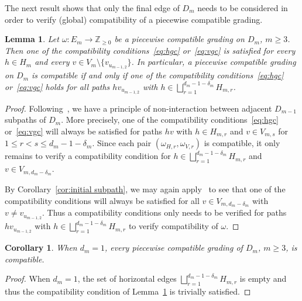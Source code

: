 \documentclass[10pt]{amsart}
\newtheorem{lemma}[theorem]{Lemma}
\newtheorem{corollary}[theorem]{Corollary}
\theoremstyle{definition}
\newcommand{\ZZ}{\mathbb{Z}}
\begin{document}
The next result shows that only the final edge of $D_m$ needs to be considered in order to verify (global) compatibility of a piecewise compatible grading.
\begin{lemma}
 \label{le:compatibility check}
 Let $\omega:E_m\to\ZZ_{\ge0}$ be a piecewise compatible grading on $D_m$, $m\ge3$.
 Then one of the compatibility conditions~\eqref{eq:hgc} or~\eqref{eq:vgc} is satisfied for every $h\in H_m$ and every $v\in V_m\setminus\{v_{u_{m-1,2}}\}$.
 In particular, a piecewise compatible grading on $D_m$ is compatible if and only if one of the compatibility conditions~\eqref{eq:hgc} or~\eqref{eq:vgc} holds for all paths $hv_{u_{m-1,2}}$ with $h\in\bigsqcup\limits_{r=1}^{d_m-1-\delta_m} H_{m,r}$.
\end{lemma}
\begin{proof}
 Following~\cite[Remark~2.22]{rupel2}, we have a principle of non-interaction between adjacent $D_{m-1}$ subpaths of $D_m$. 
 More precisely, one of the compatibility conditions~\eqref{eq:hgc} or~\eqref{eq:vgc} will always be satisfied for paths $hv$ with $h\in H_{m,r}$ and $v\in V_{m,s}$ for $1\le r<s\le d_m-1-\delta_m$. 
 Since each pair $(\omega_{H,r},\omega_{V,r})$ is compatible, it only remains to verify a compatibility condition for $h\in\bigsqcup\limits_{r=1}^{d_m-1-\delta_m} H_{m,r}$ and $v\in V_{m,d_m-\delta_m}$. 

 By Corollary~\ref{cor:initial subpath}, we may again apply~\cite[Remark~2.22]{rupel2} to see that one of the compatibility conditions will always be satisfied for all $v\in V_{m,d_m-\delta_m}$ with $v\ne v_{u_{m-1,2}}$.
 Thus a compatibility conditions only needs to be verified for paths $hv_{u_{m-1,2}}$ with $h\in\bigsqcup\limits_{r=1}^{d_m-1-\delta_m} H_{m,r}$ to verify compatibility of $\omega$.
\end{proof}
\begin{corollary}
 \label{cor:automatic compatibility}
 When $d_m=1$, every piecewise compatible grading of $D_m$, $m\ge3$, is compatible.
\end{corollary}
\begin{proof}
 When $d_m=1$, the set of horizontal edges $\bigsqcup\limits_{r=1}^{d_m-1-\delta_m} H_{m,r}$ is empty and thus the compatibility condition of Lemma~\ref{le:compatibility check} is trivially satisfied.
\end{proof}
\end{document}
